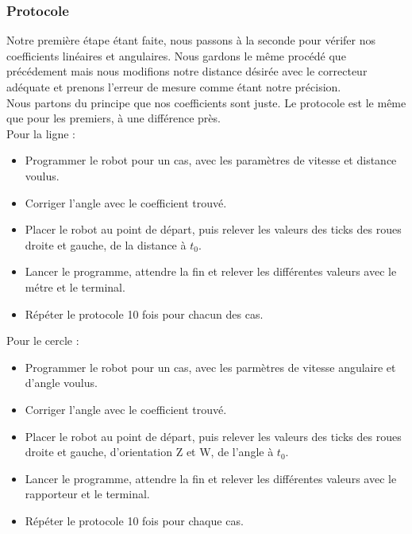 \documentclass[10pt,a4paper]{article}
\begin{document}
\subsubsection{Protocole}
Notre première étape étant faite, nous passons à la seconde pour vérifer nos coefficients linéaires et angulaires. Nous gardons le même procédé que précédement mais nous modifions notre distance désirée avec le correcteur adéquate et prenons l'erreur de mesure comme étant notre précision.\\
Nous partons du principe que nos coefficients sont juste.
Le protocole est le même que pour les premiers, à une différence près.\\
Pour la ligne : \\
\begin{itemize}
\item Programmer le robot pour un cas, avec les paramètres de vitesse et distance voulus. \\
\item Corriger l'angle avec le coefficient trouvé.\\
\item Placer le robot au point de départ, puis relever les valeurs des ticks des roues droite et gauche, de la distance à $t_0$.\\
\item Lancer le programme, attendre la fin et relever les différentes valeurs avec le métre et le terminal.\\
\item Répéter le protocole 10 fois pour chacun des cas.\\
\end{itemize}
\vspace{5mm}

Pour le cercle : \\
\begin{itemize}
\item Programmer le robot pour un cas, avec les parmètres de vitesse angulaire et d'angle voulus.\\
\item Corriger l'angle avec le coefficient trouvé.\\
\item Placer le robot au point de départ, puis relever les valeurs des ticks des roues droite et gauche, d'orientation Z et W, de l'angle à $t_0$.\\
\item Lancer le programme, attendre la fin et relever les différentes valeurs avec le rapporteur et le terminal.\\
\item Répéter le protocole 10 fois pour chaque cas.\\
\end{itemize}
\vspace{5mm}
\end{document}
